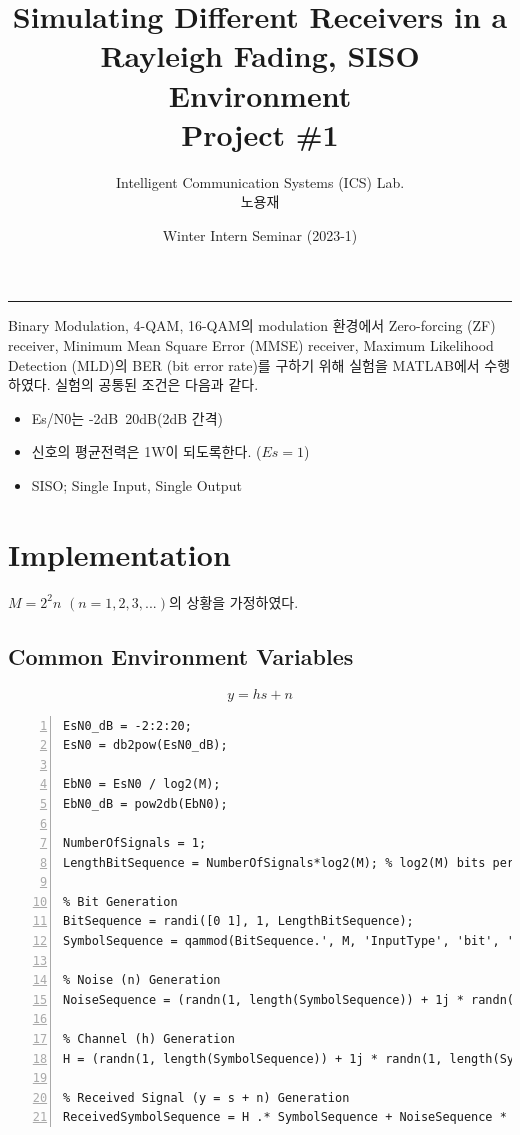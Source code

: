 \documentclass{article}
\title{Simulating Different Receivers in a \\Rayleigh Fading, SISO Environment\\
\large Project \#1}
\author{Intelligent Communication Systems (ICS) Lab.\\노용재}
\date{Winter Intern Seminar (2023-1)}
\begin{document}
\maketitle
\tableofcontents
\vspace{0.5cm}
\hrule
\vspace{0.5cm}

Binary Modulation, 4-QAM, 16-QAM의 modulation 환경에서 Zero-forcing (ZF) receiver, Minimum Mean Square Error (MMSE) receiver, Maximum Likelihood Detection (MLD)의 BER (bit error rate)를 구하기 위해 실험을 MATLAB에서 수행하였다. 실험의 공통된 조건은 다음과 같다.

\begin{itemize}
  \item Es/N0는 -2dB~20dB(2dB 간격)
  \item 신호의 평균전력은 1W이 되도록한다. ($Es=1$)
  \item SISO; Single Input, Single Output
\end{itemize}
\section{Implementation}
$M=2^2n$ $(n=1,2,3,...)$의 상황을 가정하였다.
\subsection{Common Environment Variables}
\begin{equation}
y=hs+n
\end{equation}
\begin{lstlisting}[style=Matlab-editor, frame=single, numbers=left,]
EsN0_dB = -2:2:20;
EsN0 = db2pow(EsN0_dB);

EbN0 = EsN0 / log2(M);
EbN0_dB = pow2db(EbN0);

NumberOfSignals = 1;
LengthBitSequence = NumberOfSignals*log2(M); % log2(M) bits per signal

% Bit Generation
BitSequence = randi([0 1], 1, LengthBitSequence);
SymbolSequence = qammod(BitSequence.', M, 'InputType', 'bit', 'UnitAveragePower', 1).';

% Noise (n) Generation
NoiseSequence = (randn(1, length(SymbolSequence)) + 1j * randn(1, length(SymbolSequence))) / sqrt(2); 

% Channel (h) Generation
H = (randn(1, length(SymbolSequence)) + 1j * randn(1, length(SymbolSequence))) ./ sqrt(2);

% Received Signal (y = s + n) Generation
ReceivedSymbolSequence = H .* SymbolSequence + NoiseSequence * sqrt(1 / EsN0(indx_EbN0));

\end{lstlisting}
\end{document}
